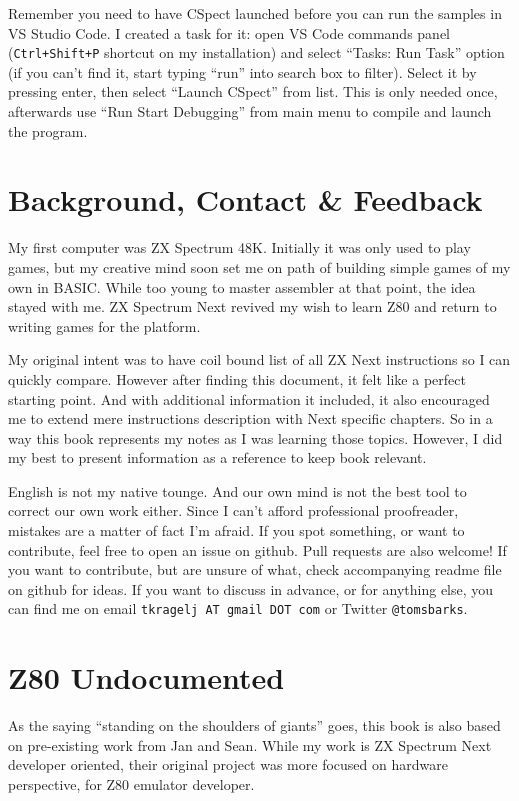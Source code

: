 \documentclass[12pt,twoside,openright,a4paper]{book}
\begin{document}
Remember you need to have CSpect launched before you can run the samples in VS Studio Code. I created a task for it: open VS Code commands panel ({\tt Ctrl+Shift+P} shortcut on my installation) and select ``Tasks: Run Task'' option (if you can't find it, start typing ``run'' into search box to filter). Select it by pressing enter, then select ``Launch CSpect'' from list. This is only needed once, afterwards use ``Run \> Start Debugging'' from main menu to compile and launch the program.


\section{Background, Contact \& Feedback}

My first computer was ZX Spectrum 48K. Initially it was only used to play games, but my creative mind soon set me on path of building simple games of my own in BASIC. While too young to master assembler at that point, the idea stayed with me. ZX Spectrum Next revived my wish to learn Z80 and return to writing games for the platform.
	
My original intent was to have coil bound list of all ZX Next instructions so I can quickly compare. However after finding this document, it felt like a perfect starting point. And with additional information it included, it also encouraged me to extend mere instructions description with Next specific chapters. So in a way this book represents my notes as I was learning those topics. However, I did my best to present information as a reference to keep book relevant.

English is not my native tounge. And our own mind is not the best tool to correct our own work either. Since I can't afford professional proofreader, mistakes are a matter of fact I'm afraid. If you spot something, or want to contribute, feel free to open an issue on github. Pull requests are also welcome! If you want to contribute, but are unsure of what, check accompanying readme file on github for ideas. If you want to discuss in advance, or for anything else, you can find me on email {\tt tkragelj AT gmail DOT com} or Twitter {\tt @tomsbarks}.


\pagebreak
\section{Z80 Undocumented}

As the saying ``standing on the shoulders of giants'' goes, this book is also based on pre-existing work from Jan and Sean. While my work is ZX Spectrum Next developer oriented, their original project was more focused on hardware perspective, for Z80 emulator developer.
\end{document}
